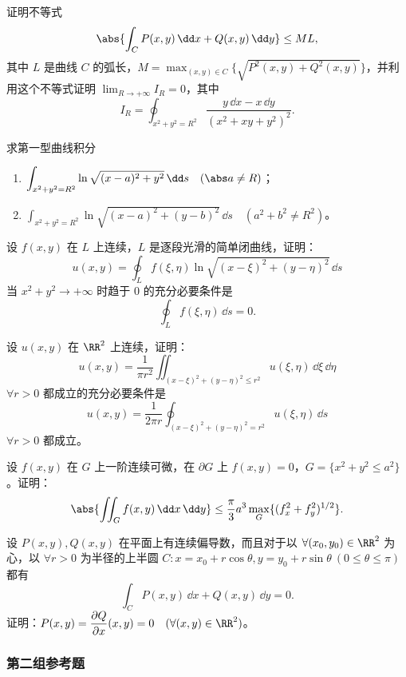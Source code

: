 \begin{xreferenceproblem}[1]
证明不等式
\[
  \abs{\int_CP(x,y)\,\dd x+Q(x,y)\,\dd y}\le ML,
\]
其中 $L$ 是曲线 $C$ 的弧长，$M=\max_{(x,y)\in C}\{\sqrt{P^2(x,y)+Q^2(x,y)}\}$，并利用这个不等式证明 $\displaystyle\lim_{R\to+\infty}I_R=0$，其中
\[
  I_R=\oint_{x^2+y^2=R^2}\frac{y\,\dd x-x\,\dd y}{(x^2+xy+y^2)^2}.
\]
\end{xreferenceproblem}\begin{xreferenceproblem}[2]
求第一型曲线积分
\begin{enumerate}[label=(\arabic*)]
  \item $\displaystyle\int_{x^2+y^2=R^2}\ln\sqrt{(x-a)^2+y^2}\,\dd s\quad(\abs a\ne R)$；
  \item $\displaystyle\int_{x^2+y^2=R^2}\ln\sqrt{(x-a)^2+(y-b)^2}\,\dd s\quad(a^2+b^2\ne R^2)$。
\end{enumerate}
\end{xreferenceproblem}\begin{xreferenceproblem}[3]
设 $f(x,y)$ 在 $L$ 上连续，$L$ 是逐段光滑的简单闭曲线，证明：
\[
  u(x,y)=\oint_Lf(\xi,\eta)\ln\sqrt{(x-\xi)^2+(y-\eta)^2}\,\dd s
\]
当 $x^2+y^2\to+\infty$ 时趋于 0 的充分必要条件是
\[
  \oint_Lf(\xi,\eta)\,\dd s=0.
\]
\end{xreferenceproblem}\begin{xreferenceproblem}[4]
设 $u(x,y)$ 在 $\RR^2$ 上连续，证明：
\[
  u(x,y)=\frac1{\pi r^2}\iint_{(x-\xi)^2+(y-\eta)^2\le r^2}u(\xi,\eta)\,\dd\xi\,\dd\eta
\]
$\forall r>0$ 都成立的充分必要条件是
\[
  u(x,y)=\frac1{2\pi r}\oint_{(x-\xi)^2+(y-\eta)^2=r^2}u(\xi,\eta)\,\dd s
\]
$\forall r>0$ 都成立。
\end{xreferenceproblem}\begin{xreferenceproblem}[5]
设 $f(x,y)$ 在 $G$ 上一阶连续可微，在 $\partial G$ 上 $f(x,y)=0$，$G=\{x^2+y^2\le a^2\}$。证明：
\[
  \abs{\iint_Gf(x,y)\,\dd x\,\dd y}\le\frac\pi3a^3\max_G\{(f_x^2+f_y^2)^{1/2}\}.
\]
\end{xreferenceproblem}\begin{xreferenceproblem}[6]
设 $P(x,y),Q(x,y)$ 在平面上有连续偏导数，而且对于以 $\forall(x_0,y_0)\in\RR^2$ 为心，以 $\forall r>0$ 为半径的上半圆 $C\colon x=x_0+r\cos\theta,y=y_0+r\sin\theta\ (0\le\theta\le\pi)$ 都有
\[
  \int_CP(x,y)\,\dd x+Q(x,y)\,\dd y=0.
\]
证明：$P(x,y)=\dfrac{\partial Q}{\partial x}(x,y)=0\quad(\forall(x,y)\in\RR^2)$。
\end{xreferenceproblem}

\subsubsection*{第二组参考题}

